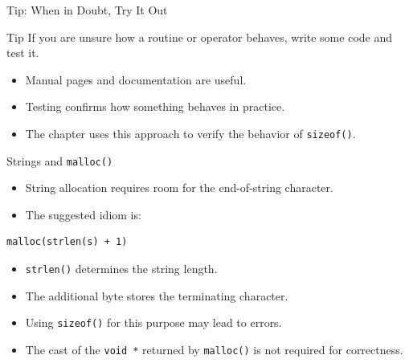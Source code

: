\begin{frame}{Tip: When in Doubt, Try It Out}
    \begin{block}{Tip}
        If you are unsure how a routine or operator behaves,
        write some code and test it.
    \end{block}

    \begin{itemize}
        \item Manual pages and documentation are useful.
        \item Testing confirms how something behaves in practice.
        \item The chapter uses this approach to verify the behavior
              of \texttt{sizeof()}.
    \end{itemize}
\end{frame}


\begin{frame}[fragile]{Strings and \texttt{malloc()}}
    \begin{itemize}
        \item String allocation requires room for the
              end-of-string character.
        \item The suggested idiom is:
    \end{itemize}

\begin{verbatim}
malloc(strlen(s) + 1)
\end{verbatim}

    \begin{itemize}
        \item \texttt{strlen()} determines the string length.
        \item The additional byte stores the terminating character.
        \item Using \texttt{sizeof()} for this purpose may lead
              to errors.
        \item The cast of the \texttt{void *} returned by
              \texttt{malloc()} is not required for correctness.
    \end{itemize}
\end{frame}


